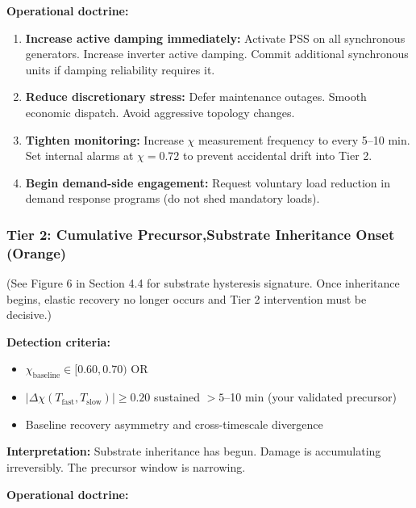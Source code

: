 \documentclass[11pt,letterpaper]{article}
\begin{document}
\textbf{Operational doctrine:}

\begin{enumerate}
\item \textbf{Increase active damping immediately:} Activate PSS on all synchronous generators. Increase inverter active damping. Commit additional synchronous units if damping reliability requires it.

\item \textbf{Reduce discretionary stress:} Defer maintenance outages. Smooth economic dispatch. Avoid aggressive topology changes.

\item \textbf{Tighten monitoring:} Increase $\chi$ measurement frequency to every 5--10 min. Set internal alarms at $\chi = 0.72$ to prevent accidental drift into Tier 2.

\item \textbf{Begin demand-side engagement:} Request voluntary load reduction in demand response programs (do not shed mandatory loads).
\end{enumerate}

\subsubsection{Tier 2: Cumulative Precursor,Substrate Inheritance Onset (Orange)}

(See Figure 6 in Section 4.4 for substrate hysteresis signature. Once inheritance begins, elastic recovery no longer occurs and Tier 2 intervention must be decisive.)

\textbf{Detection criteria:}
\begin{itemize}
\item $\chi_{\text{baseline}} \in [0.60, 0.70)$ OR
\item $|\Delta\chi(T_{\text{fast}}, T_{\text{slow}})| \geq 0.20$ sustained $> 5$--10 min (your validated precursor)
\item Baseline recovery asymmetry and cross-timescale divergence
\end{itemize}

\textbf{Interpretation:} Substrate inheritance has begun. Damage is accumulating irreversibly. The precursor window is narrowing.

\textbf{Operational doctrine:}
\end{document}
